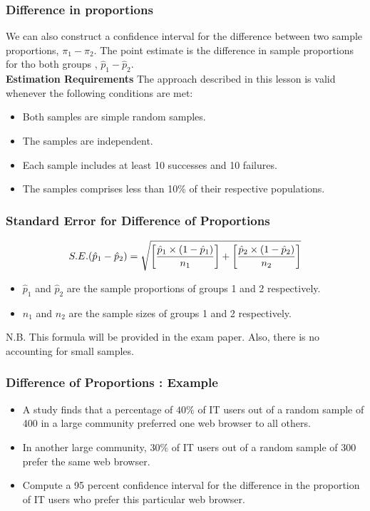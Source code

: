 \begin{frame}
\frametitle{Difference in proportions}
We can also construct a confidence interval for the difference between two sample proportions, $\pi_1 - \pi_2$. The point estimate is the difference in sample proportions for tho both groups , $\hat{p}_1- \hat{p}_2$.\\\bigskip
\textbf{Estimation Requirements}
The approach described in this lesson is valid whenever the following conditions are met:

\begin{itemize}
\item Both samples are simple random samples.
\item The samples are independent.
\item Each sample includes at least 10 successes and 10 failures.
\item The samples comprises less than 10\% of their respective populations.
\end{itemize}
\end{frame}



\begin{frame}
\frametitle{Standard Error for Difference of Proportions}

\[ S.E. (\hat{p}_1 - \hat{p}_2) =
\sqrt{ \left[{\hat{p}_1 \times (1 - \hat{p}_1) \over n_1}\right] + \left[{\hat{p}_2 \times (1 - \hat{p}_2) \over n_2}\right] } \]
\begin{itemize}
\item $\hat{p}_1$ and $\hat{p}_2$ are the sample proportions of groups 1 and 2 respectively.
\item $n_1$ and $n_2$ are the sample sizes of groups 1 and 2 respectively.
\end{itemize}
N.B. This formula will be provided in the exam paper. Also, there is no accounting for small samples.
\end{frame}

\begin{frame}
\frametitle{ Difference of Proportions : Example}
\begin{itemize} \item
A study finds that a percentage of $40\%$ of IT users out of a random sample of 400 in a large
community preferred one web browser to all others. \item In another large community, $30\%$ of IT users out of a random sample
of 300 prefer the same web browser. \item Compute a 95 percent confidence interval for the difference in the proportion of IT users who prefer this particular web browser. \end{itemize}
\end{frame}


